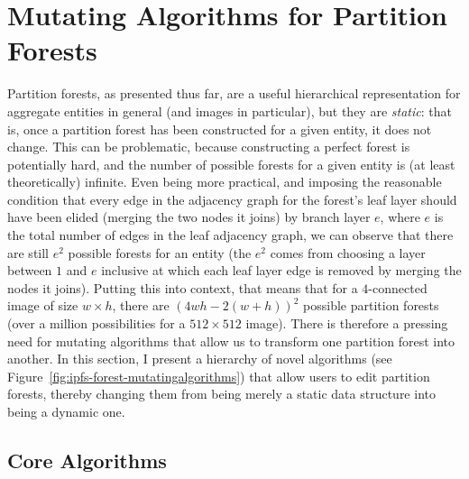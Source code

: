 \newpage

\section{Mutating Algorithms for Partition Forests}
\label{sec:ipfs-mutatingalgorithms}


Partition forests, as presented thus far, are a useful hierarchical representation for aggregate entities in general (and images in particular), but they are \emph{static}: that is, once a partition forest has been constructed for a given entity, it does not change. This can be problematic, because constructing a perfect forest is potentially hard, and the number of possible forests for a given entity is (at least theoretically) infinite. Even being more practical, and imposing the reasonable condition that every edge in the adjacency graph for the forest's leaf layer should have been elided (merging the two nodes it joins) by branch layer $e$, where $e$ is the total number of edges in the leaf adjacency graph, we can observe that there are still $e^2$ possible forests for an entity (the $e^2$ comes from choosing a layer between $1$ and $e$ inclusive at which each leaf layer edge is removed by merging the nodes it joins). Putting this into context, that means that for a $4$-connected image of size $w \times h$, there are $(4wh - 2(w+h))^2$ possible partition forests (over a million possibilities for a $512 \times 512$ image). There is therefore a pressing need for mutating algorithms that allow us to transform one partition forest into another. In this section, I present a hierarchy of novel algorithms (see Figure~\ref{fig:ipfs-forest-mutatingalgorithms}) that allow users to edit partition forests, thereby changing them from being merely a static data structure into being a dynamic one.


\vspace{-\baselineskip}

\subsection{Core Algorithms}

